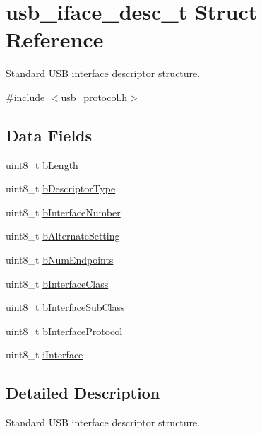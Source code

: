 \hypertarget{structusb__iface__desc__t}{
\section{usb\-\_\-iface\-\_\-desc\-\_\-t \-Struct \-Reference}
\label{structusb__iface__desc__t}
}


\-Standard \-U\-S\-B interface descriptor structure.  




{\ttfamily \#include $<$usb\-\_\-protocol.\-h$>$}

\subsection*{\-Data \-Fields}
\begin{DoxyCompactItemize}
\item 
uint8\-\_\-t \hyperlink{structusb__iface__desc__t_ac1a5ca3d8e481aabfabfecb92727eede}{b\-Length}
\item 
uint8\-\_\-t \hyperlink{structusb__iface__desc__t_afa98c630cd3015ed3b1795f1ad24a508}{b\-Descriptor\-Type}
\item 
uint8\-\_\-t \hyperlink{structusb__iface__desc__t_a7e39e94123157feab346546e3034d166}{b\-Interface\-Number}
\item 
uint8\-\_\-t \hyperlink{structusb__iface__desc__t_af26f8d8edc08cb2c5fb61c51fdb06a25}{b\-Alternate\-Setting}
\item 
uint8\-\_\-t \hyperlink{structusb__iface__desc__t_aae7be1499654d689018b8c450b86f574}{b\-Num\-Endpoints}
\item 
uint8\-\_\-t \hyperlink{structusb__iface__desc__t_a2d812b3326e8aafcfd03c71b72ea8d40}{b\-Interface\-Class}
\item 
uint8\-\_\-t \hyperlink{structusb__iface__desc__t_a023635bd8337ab81717bae41de80ff06}{b\-Interface\-Sub\-Class}
\item 
uint8\-\_\-t \hyperlink{structusb__iface__desc__t_a3f8436d03bdd0ca6691c3ead758b9f4a}{b\-Interface\-Protocol}
\item 
uint8\-\_\-t \hyperlink{structusb__iface__desc__t_a44cb19ca24e0659fcb3fa7e2522711bb}{i\-Interface}
\end{DoxyCompactItemize}


\subsection{\-Detailed \-Description}
\-Standard \-U\-S\-B interface descriptor structure. 

